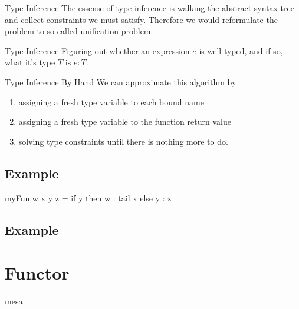 \documentclass[openany, 12pt]{book}
\begin{document}
\begin{intuition}{Type Inference}
  The essense of type inference is walking the abstract syntax tree and
  collect constraints we must satisfy. Therefore we would reformulate the
  problem to so-called unification problem.
\end{intuition}

\begin{definition}{Type Inference}{}
  Figuring out whether an expression $e$ is well-typed, and if so, what it's
  type $T$ is $e: T$.
\end{definition}

\begin{definition}{Type Inference By Hand}{}
  We can approximate this algorithm by
  \begin{enumerate}
    \item assigning a fresh type variable to each bound name
    \item assigning a fresh type variable to the function return value
    \item solving type constraints until there is nothing more to do.
  \end{enumerate}
\end{definition}

\section{Example}
\begin{haskell}{}
	myFun w x y z = if y then w : tail x else y : z
\end{haskell}

\section{Example}

\chapter{Functor}
\gls{mesa}
\glsaddallunused{}

\clearpage
\printglossaries

\printindex{}
\end{document}
